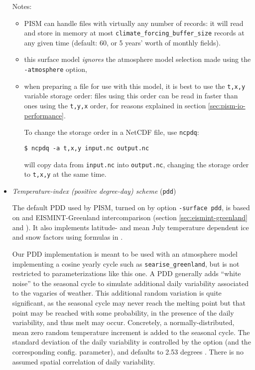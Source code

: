\begin{itemize}
\noindent Notes:
\begin{itemize}
\item PISM can handle files with virtually any number of records: it will
  read and store in memory at most \texttt{climate_forcing_buffer_size} records
  at any given time (default: 60, or 5 years' worth of monthly fields).
\item this surface model \emph{ignores} the atmosphere model selection made
  using the \texttt{-atmosphere} option,
\item when preparing a file for use with this model, it is best to use the \texttt{t,x,y} variable storage order: files using this order can be read in faster than ones using the \texttt{t,y,x} order, for reasons explained in section \ref{sec:pism-io-performance}.

To change the storage order in a NetCDF file, use \texttt{ncpdq}:
\begin{verbatim}
$ ncpdq -a t,x,y input.nc output.nc
\end{verbatim}%
will copy data from \texttt{input.nc} into \texttt{output.nc}, changing the storage order to \texttt{t,x,y} at the same time.
\end{itemize}

 \item \emph{Temperature-index (positive degree-day) scheme} (\texttt{pdd})     

   The default PDD used by PISM, turned on by option \texttt{-surface pdd}, is based on \cite{CalovGreve05} and EISMINT-Greenland intercomparison (section \ref{sec:eismint-greenland} and \cite{RitzEISMINT}).  It also implements latitude- and mean July temperature dependent ice and snow factors using formulas in \cite{Faustoetal2009}.

   Our PDD implementation is meant to be used with an atmosphere model implementing a cosine yearly cycle such as \texttt{searise_greenland}, but is not restricted to parameterizations like this one. A PDD generally adds ``white noise'' to the seasonal cycle to simulate additional daily variability associated to the vagaries of weather.  This additional random variation is quite significant, as the seasonal cycle may never reach the melting point but that point may be reached with some probability, in the presence of the daily variability, and thus melt may occur.  Concretely, a normally-distributed, mean zero random temperature increment is added to the seasonal cycle.  The standard deviation of the daily variability is controlled by the  option (and the corresponding config. parameter), and defaults to 2.53 degrees \cite{Faustoetal2009}. There is no assumed spatial correlation of daily variability.


\end{itemize}
